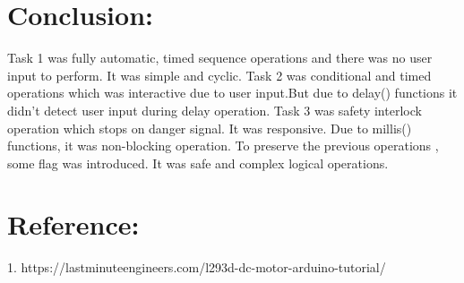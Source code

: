 \documentclass[a4paper,12pt]{article}
\begin{document}
	\section*{Conclusion:}
	Task 1 was fully automatic, timed sequence operations and there was no user input to perform. It was simple and cyclic.
	Task 2 was conditional and timed operations which was interactive due to user input.But due to delay() functions it didn't detect user input during delay operation. 
	Task 3 was safety interlock operation which stops on danger signal. It was responsive. Due to millis() functions, it was non-blocking operation. To preserve the previous operations , some flag was introduced. It was safe and complex logical operations.
	\section*{Reference:}
	1. https://lastminuteengineers.com/l293d-dc-motor-arduino-tutorial/
	
	\newpage
\end{document}
